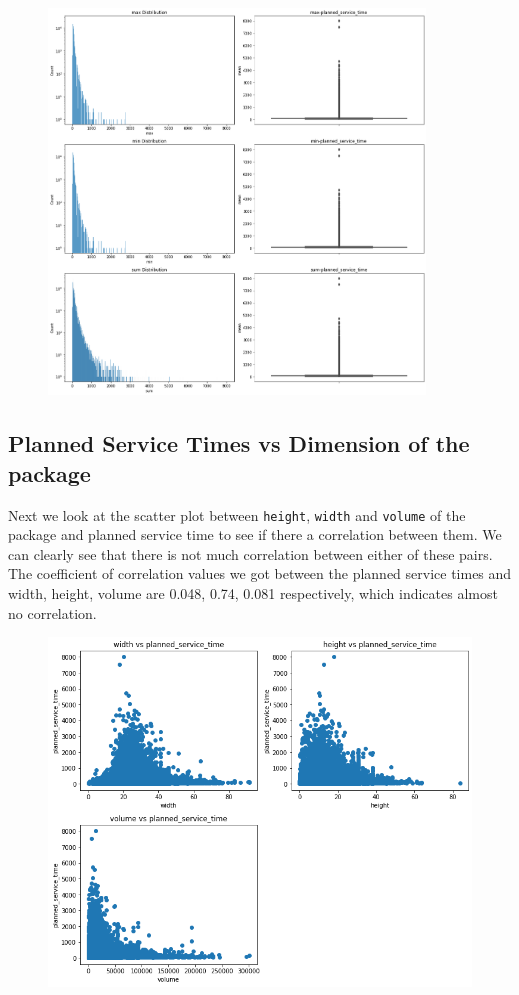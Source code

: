 \documentclass[12pt]{article}
\theoremstyle{plain}
\numberwithin{equation}{section}
\begin{document}
\begin{figure}[h!]
\centering
\includegraphics[width=10cm]{Images/service_time_dist.png}
\caption{}
\label{fig:service_time_dist}
\end{figure}


\subsection{Planned Service Times vs Dimension of the package}
Next we look at the scatter plot between \texttt{height}, \texttt{width} and \texttt{volume} of the package and planned service time to see if there a correlation between them. We can clearly see that there is not much correlation between either of these pairs. The coefficient of correlation values we got between the planned service times and width, height, volume are 0.048, 0.74, 0.081 respectively, which indicates almost no correlation.

\begin{figure}[h!]
\centering
\includegraphics[width=14cm]{Images/dim-scatter.png}
\caption{}
\label{fig:dim-scatter}
\end{figure}
\end{document}
